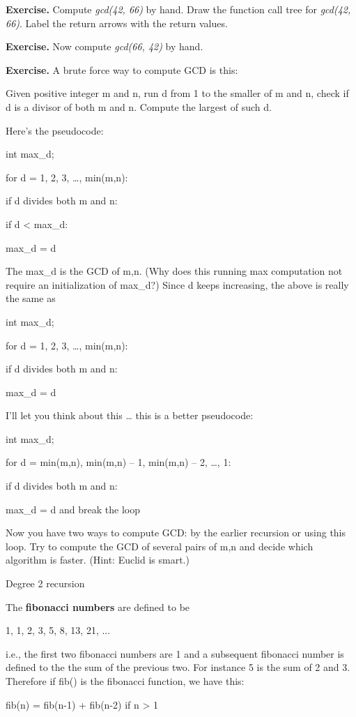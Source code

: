 \documentclass[
]{article}
\begin{document}
\hfill\break

\textbf{Exercise.} Compute \emph{gcd(42, 66)} by hand. Draw the function
call tree for \emph{gcd(42, 66)}. Label the return arrows with the
return values.

\textbf{Exercise.} Now compute \emph{gcd(66, 42)} by hand.

\textbf{Exercise.} A brute force way to compute GCD is this:

Given positive integer m and n, run d from 1 to the smaller of m and n,
check if d is a divisor of both m and n. Compute the largest of such d.

Here's the pseudocode:

int max\_d;

for d = 1, 2, 3, \ldots, min(m,n):

if d divides both m and n:

if d \textless{} max\_d:

max\_d = d

The max\_d is the GCD of m,n. (Why does this running max computation not
require an initialization of max\_d?) Since d keeps increasing, the
above is really the same as

int max\_d;

for d = 1, 2, 3, \ldots, min(m,n):

if d divides both m and n:

max\_d = d

I'll let you think about this \ldots{} this is a better pseudocode:

int max\_d;

for d = min(m,n), min(m,n) -- 1, min(m,n) -- 2, \ldots, 1:

if d divides both m and n:

max\_d = d and break the loop

Now you have two ways to compute GCD: by the earlier recursion or using
this loop. Try to compute the GCD of several pairs of m,n and decide
which algorithm is faster. (Hint: Euclid is smart.)

Degree 2 recursion

The \textbf{fibonacci numbers} are defined to be

1, 1, 2, 3, 5, 8, 13, 21, ...

i.e., the first two fibonacci numbers are 1 and a subsequent fibonacci
number is defined to the the sum of the previous two. For instance 5 is
the sum of 2 and 3. Therefore if fib() is the fibonacci function, we
have this:

fib(n) = fib(n-1) + fib(n-2) if n \textgreater{} 1
\end{document}
